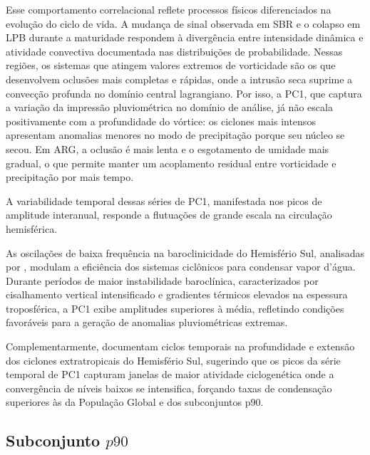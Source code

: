 Esse comportamento correlacional reflete processos físicos diferenciados na evolução do ciclo de vida.
A mudança de sinal observada em SBR e o colapso em LPB durante a maturidade respondem à divergência entre intensidade dinâmica e atividade convectiva documentada nas distribuições de probabilidade.
Nessas regiões, os sistemas que atingem valores extremos de vorticidade são os que desenvolvem oclusões mais completas e rápidas, onde a intrusão seca suprime a convecção profunda no domínio central lagrangiano.
Por isso, a PC1, que captura a variação da impressão pluviométrica no domínio de análise, já não escala positivamente com a profundidade do vórtice: os ciclones mais intensos apresentam anomalias menores no modo de precipitação porque seu núcleo se secou.
Em ARG, a oclusão é mais lenta e o esgotamento de umidade mais gradual, o que permite manter um acoplamento residual entre vorticidade e precipitação por mais tempo.

A variabilidade temporal dessas séries de PC1, manifestada nos picos de amplitude interanual, responde a flutuações de grande escala na circulação hemisférica.

As oscilações de baixa frequência na baroclinicidade do Hemisfério Sul, analisadas por \citet{machado2020influence}, modulam a eficiência dos sistemas ciclônicos para condensar vapor d'água.
Durante períodos de maior instabilidade baroclínica, caracterizados por cisalhamento vertical intensificado e gradientes térmicos elevados na espessura troposférica, a PC1 exibe amplitudes superiores à média, refletindo condições favoráveis para a geração de anomalias pluviométricas extremas.

Complementarmente, \citet{simmonds2000variability} documentam ciclos temporais na profundidade e extensão dos ciclones extratropicais do Hemisfério Sul, sugerindo que os picos da série temporal de PC1 capturam janelas de maior atividade ciclogenética onde a convergência de níveis baixos se intensifica, forçando taxas de condensação superiores às da População Global e dos subconjuntos p90.

\subsection{Subconjunto $p90$}\label{subsubsec:pc1_p90_tp}




